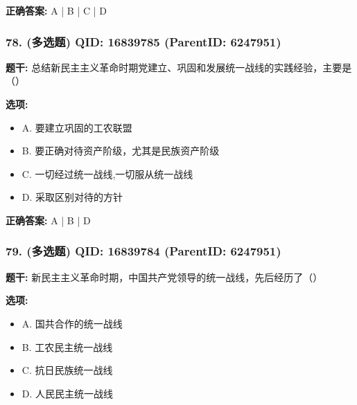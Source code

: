 \documentclass[12pt,UTF8]{ctexart}
\begin{document}
\textbf{正确答案:}
A | B | C | D

\vspace{0.3em}\hrulefill\vspace{0.7em}

\subsubsection*{78. (多选题) \small QID: 16839785 (ParentID: 6247951)}

\textbf{题干:}
总结新民主主义革命时期党建立、巩固和发展统一战线的实践经验，主要是（）



\textbf{选项:}
\begin{itemize}[leftmargin=*]

  \item A. 要建立巩固的工农联盟

  \item B. 要正确对待资产阶级，尤其是民族资产阶级

  \item C. 一切经过统一战线,一切服从统一战线

  \item D. 采取区别对待的方针

\end{itemize}

\textbf{正确答案:}
A | B | D

\vspace{0.3em}\hrulefill\vspace{0.7em}

\subsubsection*{79. (多选题) \small QID: 16839784 (ParentID: 6247951)}

\textbf{题干:}
新民主主义革命时期，中国共产党领导的统一战线，先后经历了（）



\textbf{选项:}
\begin{itemize}[leftmargin=*]

  \item A. 国共合作的统一战线

  \item B. 工农民主统一战线

  \item C. 抗日民族统一战线

  \item D. 人民民主统一战线

\end{itemize}
\end{document}
